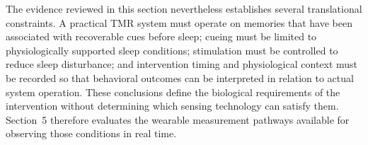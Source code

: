 The evidence reviewed in this section nevertheless establishes several
translational constraints. A practical TMR system must operate on memories that
have been associated with recoverable cues before sleep; cueing must be limited
to physiologically supported sleep conditions; stimulation must be controlled
to reduce sleep disturbance; and intervention timing and physiological context
must be recorded so that behavioral outcomes can be interpreted in relation to
actual system operation. These conclusions define the biological requirements
of the intervention without determining which sensing technology can satisfy
them. Section~5 therefore evaluates the wearable measurement pathways available
for observing those conditions in real time.